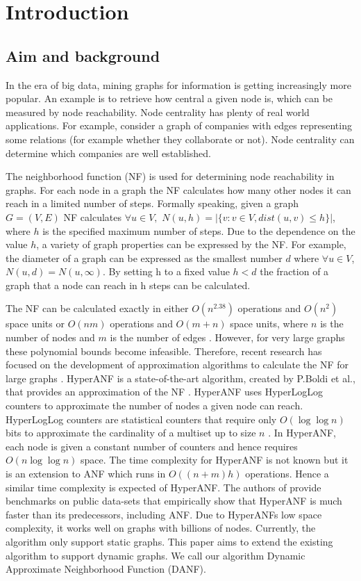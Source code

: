 \chapter{Introduction}

\section{Aim and background}
In the era of big data, mining graphs for information is getting increasingly more popular. An example is to retrieve how central a given node is, which can be measured by node reachability. Node centrality has plenty of real world applications. For example, consider a graph of companies with edges representing some relations (for example whether they collaborate or not). Node centrality can determine which companies are well established. 

The neighborhood function (NF) is used for determining node reachability in graphs. For each node in a graph the NF calculates how many other nodes it can reach in a limited number of steps. Formally speaking, given a graph $G = (V,E)$ NF calculates $\forall u \in V,$ $N(u,h) = |\{v : v \in V, dist(u,v) \leq h \}|$, where $h$ is the specified maximum number of steps. Due to the dependence on the value $h$, a variety of graph properties can be expressed by the NF. For example, the diameter of a graph can be expressed as the smallest number $d$ where $ \forall u \in V$, $N(u,d) = N(u,\infty)$. By setting h to a fixed value $h < d$ the fraction of a graph that a node can reach in h steps can be calculated.

The NF can be calculated exactly in either $O(n^{2.38})$ operations and $O(n^2)$ space units or $O(nm)$ operations and $O(m + n)$ space units, where $n$ is the number of nodes and $m$ is the number of edges \cite{Palmer01}. However, for very large graphs these polynomial bounds become infeasible. Therefore, recent research has focused on the development of approximation algorithms to calculate the NF for large graphs \cite{Palmer01,hyperanf,anf}. HyperANF is a state-of-the-art algorithm, created by P.Boldi et al., that provides an approximation of the NF \cite{hyperanf}. HyperANF uses HyperLogLog counters to approximate the number of nodes a given node can reach. HyperLogLog counters are statistical counters that require only $O( \log\log n)$ bits to approximate the cardinality of a multiset up to size $n$ \cite{hyperloglog}. In HyperANF, each node is given a constant number of counters and hence requires $O(n \log\log n)$ space. The time complexity for HyperANF is not known but it is an extension to ANF which runs in $O((n+m)h)$ operations. Hence a similar time complexity is expected of HyperANF. The authors of \cite{hyperanf} provide benchmarks on public data-sets that empirically show that HyperANF is much faster than its predecessors, including ANF. Due to HyperANFs low space complexity, it works well on graphs with billions of nodes. Currently, the algorithm only support  static graphs. This paper aims to extend the existing algorithm to support dynamic graphs. We call our algorithm Dynamic Approximate Neighborhood Function (DANF).

